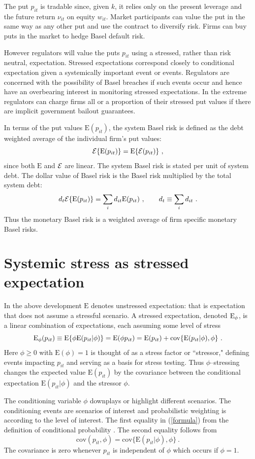 \documentclass[authoryear]{elsarticle}
\newcommand{\E}{\mathrm{E}}
\newcommand{\cov}{\mathrm{cov}}
\newcommand{\Ex}{{\cal E}}
\newcommand{\eref}[1]{(\ref{#1})}
\newcommand{\cq}{\ , \qquad}
\newcommand{\be}[1]{\begin{equation}\label{#1}}
\newcommand{\ee}{\end{equation}}
\begin{document}
The put $p_{it}$ is tradable since, given $k$, it relies only on the present leverage and the future return $\nu_{it}$ on equity $w_{it}$.  Market participants can value the put in  the same way as any other put and use the contract to diversify risk.  Firms can buy puts in the market to hedge Basel default risk.    

However regulators will value the puts $p_{it}$ using a stressed, rather than risk neutral, expectation.   Stressed expectations correspond closely to conditional expectation given a systemically important event or events.    Regulators are concerned with the possibility of Basel breaches if such events occur and hence have an overbearing interest in monitoring stressed expectations.   In the extreme regulators can charge firms all or a  proportion of their stressed put values if there are implicit government bailout guarantees.

In terms of the put values $\E(p_{it})$, the  system Basel risk is defined as the debt weighted average of the individual firm's put values:
\be{nsrisk}
\Ex\{\E(p_{it})\} = \E\{\Ex(p_{it})\}  \ , 
\ee
since both $\E$ and $\Ex$ are linear.
The  system Basel risk is stated per unit of system debt.  The dollar value of Basel risk is the Basel risk multiplied by the total system debt:
$$
d_t\Ex\{\E(p_{it})\}  = \sum_id_{it}\E(p_{it}) \cq d_t\equiv\sum_id_{it}\ .
$$
Thus the monetary  Basel risk is a  weighted average  of firm specific monetary Basel risks.  




\section{Systemic stress as stressed expectation}

In the above development $\E$  denotes  unstressed expectation:  that is expectation that does not assume a stressful scenario.   A stressed expectation, denoted $\Es$, is a
linear combination of  expectations, each assuming some level of stress
\be{formula}
\Es(p_{it}) \equiv \E\{\phi\E(p_{it}|\phi)\} = \E(\phi p_{it}) = \E(p_{it}) + \cov\{\E(p_{it}|\phi),\phi\}\ .
\ee 
Here $\phi\ge 0$ with $\E(\phi)=1$ is thought of as a stress factor or ``stressor,"  defining events impacting $p_{it}$  and serving as a basis for stress testing.  Thus $\phi$--stressing  changes the expected value $\E(p_{it})$ by the covariance between the conditional expectation $\E(p_{it}|\phi)$  and the stressor $\phi$.

The conditioning variable $\phi$  downplays or highlight different scenarios.  The conditioning events are scenarios of interest and  probabilistic weighting is according to the level of interest.  The first equality in \eref{formula}  from the definition of conditional probability \citep{whittle2000probability}.  The second equality follows from
$$
\cov(p_{it},\phi)=\cov\{\E(p_{it}|\phi),\phi\}\ .
$$
The covariance is zero whenever  $p_{it}$ is independent of $\phi$ which occurs if $\phi=1$.
\end{document}

